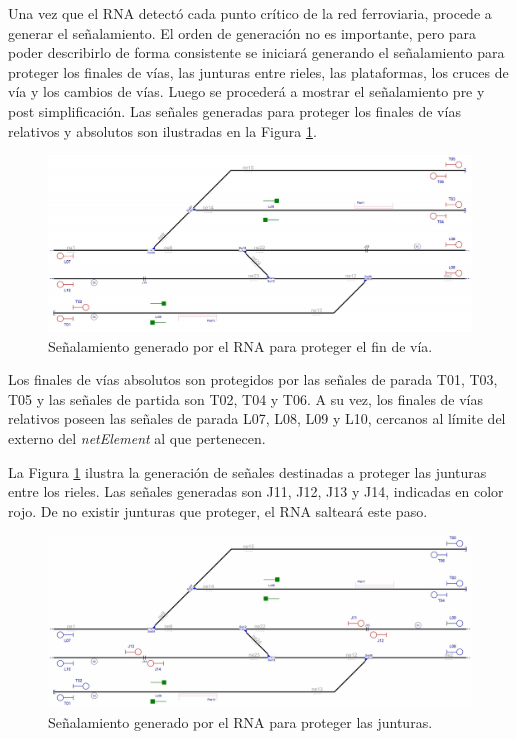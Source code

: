 	Una vez que el RNA detectó cada punto crítico de la red ferroviaria, procede a generar el señalamiento. El orden de generación no es importante, pero para poder describirlo de forma consistente se iniciará generando el señalamiento para proteger los finales de vías, las junturas entre rieles, las plataformas, los cruces de vía y los cambios de vías. Luego se procederá a mostrar el señalamiento pre y post simplificación. Las señales generadas para proteger los finales de vías relativos y absolutos son ilustradas en la Figura \ref{fig:EJ1_3}.
	
	\begin{figure}[H]
		\centering
		\includegraphics[width=1\textwidth]{resultados-obtenidos/ejemplo1/images/1_step1.png}
		\centering\caption{Señalamiento generado por el RNA para proteger el fin de vía.}
		\label{fig:EJ1_3}
	\end{figure}
	
	Los finales de vías absolutos son protegidos por las señales de parada T01, T03, T05 y las señales de partida son T02, T04 y T06. A su vez, los finales de vías relativos poseen las señales de parada L07, L08, L09 y L10, cercanos al límite del externo del \textit{netElement} al que pertenecen.
	
	La Figura \ref{fig:EJ1_3} ilustra la generación de señales destinadas a proteger las junturas entre los rieles. Las señales generadas son J11, J12, J13 y J14, indicadas en color rojo. De no existir junturas que proteger, el RNA salteará este paso.
	
	\begin{figure}[H]
		\centering
		\includegraphics[width=1\textwidth]{resultados-obtenidos/ejemplo1/images/1_step2.png}
		\centering\caption{Señalamiento generado por el RNA para proteger las junturas.}
		\label{fig:EJ1_4}
	\end{figure}
	
